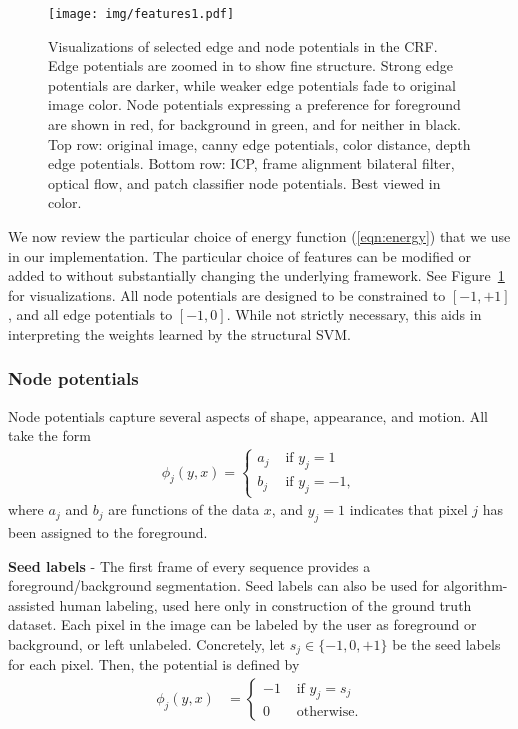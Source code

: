 \documentclass[graybox]{svmult}
\begin{document}
\begin{figure}
  \centering
  \texttt{[image: img/features1.pdf]}
  \caption{Visualizations of selected edge and node potentials in the CRF.  Edge potentials are zoomed in to show fine structure.  Strong edge potentials are darker, while weaker edge potentials fade to original image color.  Node potentials expressing a preference for foreground are shown in red, for background in green, and for neither in black.  Top row: original image, canny edge potentials, color distance, depth edge potentials.  Bottom row: ICP, frame alignment bilateral filter, optical flow, and patch classifier node potentials.  Best viewed in color.}
  \label{fig:features}
\end{figure}

We now review the particular choice of energy function (\ref{eqn:energy}) that we use in our implementation. The particular choice of features can be modified or added to without substantially changing the underlying framework. See Figure~\ref{fig:features} for visualizations.  All node potentials are designed to be constrained to $[-1, +1]$, and all edge potentials to $[-1, 0]$.  While not strictly necessary, this aids in interpreting the weights learned by the structural SVM.

\subsubsection{Node potentials}
\label{sec:npot}
Node potentials capture several aspects of shape, appearance, and motion.  All take the form
\begin{align}
  \label{eqn:npot}
  \phi_j(y, x) = 
  \left\{
  \begin{array}{rl}
    a_j & \mbox{ if } y_j = 1 \\
    b_j & \mbox{ if } y_j = -1,
  \end{array} 
  \right.
\end{align}
where $a_j$ and $b_j$ are functions of the data $x$, and $y_j = 1$ indicates that pixel $j$ has been assigned to the foreground.

\textbf{Seed labels} - The first frame of every sequence provides a foreground/background segmentation.  Seed labels can also be used for algorithm-assisted human labeling, used here only in construction of the ground truth dataset.  Each pixel in the image can be labeled by the user as foreground or background, or left unlabeled.  Concretely, let $s_j \in \{-1,0,+1\}$ be the seed labels for each pixel.  Then, the potential is defined by
\begin{align*}
  \phi_j(y, x) & =
  \left\{
  \begin{array}{rl}
    -1 & \mbox{ if } y_j = s_j \\
    0 & \mbox{ otherwise.}
  \end{array}
  \right.
\end{align*}
\end{document}
